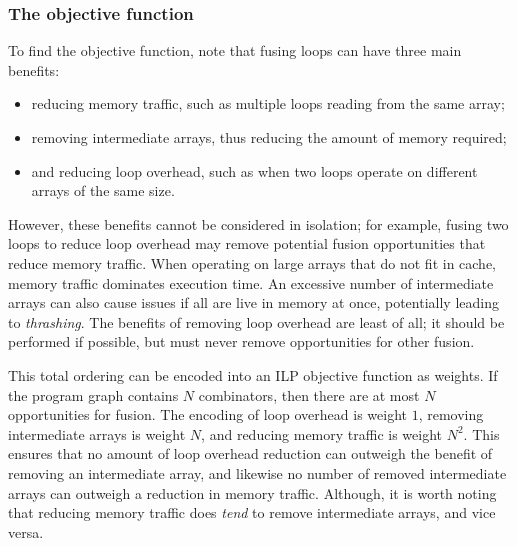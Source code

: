 \subsubsection{The objective function}
\label{s:ObjectiveFunction}

To find the objective function, note that fusing loops can have three main benefits:
\begin{itemize}
\item
reducing memory traffic, such as multiple loops reading from the same array;
\item
removing intermediate arrays, thus reducing the amount of memory required;
\item
and reducing loop overhead, such as when two loops operate on different arrays of the same size.
\end{itemize}
However, these benefits cannot be considered in isolation; for example, fusing two loops to reduce loop overhead may remove potential fusion opportunities that reduce memory traffic.
When operating on large arrays that do not fit in cache, memory traffic dominates execution time.
An excessive number of intermediate arrays can also cause issues if all are live in memory at once, potentially leading to \emph{thrashing}.
The benefits of removing loop overhead are least of all; it should be performed if possible, but must never remove opportunities for other fusion. 

This total ordering can be encoded into an ILP objective function as weights.
If the program graph contains $N$ combinators, then there are at most $N$ opportunities for fusion.
The encoding of loop overhead is weight $1$, removing intermediate arrays is weight $N$, and reducing memory traffic is weight $N^2$.
This ensures that no amount of loop overhead reduction can outweigh the benefit of removing an intermediate array,
and likewise no number of removed intermediate arrays can outweigh a reduction in memory traffic.
Although, it is worth noting that reducing memory traffic does \emph{tend} to remove intermediate arrays, and vice versa.

